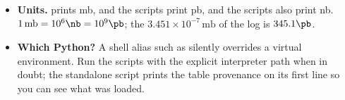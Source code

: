 \begin{pitfalls}
\begin{itemize}[nosep]
    hard-process listing, saved with that extension because it plays the role
    of the LHE record. Status codes ($-21$, $23$) are \PYTHIA's, not the LHE
    standard's ($-1$, $1$).
  \item \textbf{Units.} \PYTHIA prints mb, \MG and the scripts print pb, and
    the scripts also print nb. $1\,\mathrm{mb}=10^{6}\nb=10^{9}\pb$; the
    $3.451\times10^{-7}\,\mathrm{mb}$ of the log is $345.1\pb$.
  \item \textbf{Which Python?} A shell alias such as
     silently overrides a virtual
    environment. Run the scripts with the explicit interpreter path when in
    doubt; the standalone script prints the table provenance on its first
    line so you can see what was loaded.
\end{itemize}
\end{pitfalls}

